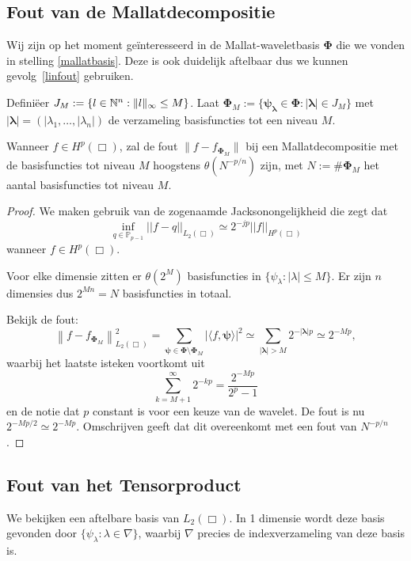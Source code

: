 \subsection{Fout van de Mallatdecompositie}
Wij zijn op het moment ge\"interesseerd in de Mallat-waveletbasis $\boldsymbol\Phi$ die we vonden in stelling \ref{mallatbasis}. Deze is ook duidelijk aftelbaar dus we kunnen gevolg~\ref{linfout} gebruiken. 

Defini\"eer $J_M := \{ l \in \mathbb{N}^n: \| l \|_\infty \leq M \}$. Laat $\boldsymbol\Phi_M := \{ \boldsymbol{\psi}_{\boldsymbol{\lambda}} \in \boldsymbol\Phi: |\boldsymbol\lambda| \in J_M \}$ met $|\boldsymbol\lambda| = (|\lambda_1, \ldots, |\lambda_n|)$ de verzameling basisfuncties tot een niveau $M$.

\begin{stelling}
\label{thm:foutmallat}
Wanneer $f \in H^p(\Box)$, zal de fout $\| f - f_{\boldsymbol\Phi_M} \|$ bij een Mallatdecompositie met de basisfuncties tot niveau $M$ hoogstens $\theta(N^{-p/n})$ zijn, met $N := \# \boldsymbol\Phi_M$ het aantal basisfuncties tot niveau $M$.
\end{stelling}
\begin{proof}

  We maken gebruik van de zogenaamde Jacksonongelijkheid \cite{jackson} die zegt dat 
  \[
  \inf_{q \in \mathbb{P}_{p-1}} ||f - q||_{L_2(\Box)} \simeq 2^{-jp} ||f||_{H^p(\Box)}
  \]
  wanneer $f \in H^p(\Box)$.

  Voor elke dimensie zitten er $\theta(2^M)$ basisfuncties in $\{ \psi_\lambda: |\lambda| \leq M \}$. Er zijn $n$ dimensies dus $2^{Mn} = N$ basisfuncties in totaal.

  Bekijk de fout:
  \[
  \left\| f - f_{\boldsymbol\Phi_M} \right\|^2_{L_2(\Box)} = \sum_{{\boldsymbol\psi} \in \boldsymbol\Phi \setminus \boldsymbol\Phi_M} | \langle f, \boldsymbol\psi \rangle |^2 \simeq \sum_{|\boldsymbol\lambda| > M} 2^{-|\boldsymbol\lambda|p} \simeq 2^{-Mp},
  \]
  waarbij het laatste isteken voortkomt uit
  \[
  \sum_{k=M+1}^\infty 2^{- kp} = \frac{2^{-Mp}}{2^p-1}
  \]
  en de notie dat $p$ constant is voor een keuze van de wavelet. De fout is nu $2^{-Mp/2} \simeq 2^{-Mp}$. Omschrijven geeft dat dit overeenkomt met een fout van $N^{-p/n}$.
\end{proof}

\subsection{Fout van het Tensorproduct}
We bekijken een aftelbare basis van $L_2(\Box)$. In 1 dimensie wordt deze basis gevonden door $\{ \psi_\lambda: \lambda \in \nabla \}$, waarbij $\nabla$ precies de indexverzameling van deze basis is.

